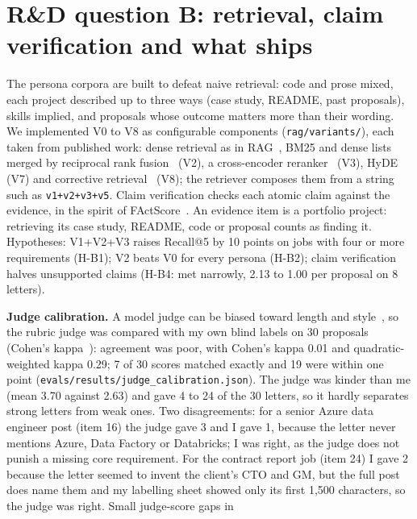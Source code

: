 \documentclass[10pt,a4paper]{article}
\newcommand{\file}[1]{\texttt{\small #1}}
\newcommand{\tablefrom}[2]{\begin{table}[h]\centering\caption{#2}\end{table}}
\begin{document}
\section{R\&D question B: retrieval, claim verification and what ships}
The persona corpora are built to defeat naive retrieval: code and prose mixed, each project described up to three
ways (case study, README, past proposals), skills implied, and proposals whose outcome matters more than their
wording. We implemented V0 to V8 as configurable components (\file{rag/variants/}), each taken from published work:
dense retrieval as in RAG~\cite{lewis2020rag}, BM25 and dense lists merged by reciprocal rank fusion~\cite{cormack2009rrf}
(V2), a cross-encoder reranker~\cite{nogueira2019rerank} (V3), HyDE~\cite{gao2023hyde} (V7) and corrective
retrieval~\cite{yan2024crag} (V8); the retriever composes them from a string such as \texttt{v1+v2+v3+v5}. Claim
verification checks each atomic claim against the evidence, in the spirit of FActScore~\cite{min2023factscore}. An evidence item is a portfolio project: retrieving its case study, README,
code or proposal counts as finding it. Hypotheses: V1+V2+V3 raises Recall@5 by 10 points on jobs with four or more
requirements (H-B1); V2 beats V0 for every persona (H-B2); claim verification halves unsupported claims (H-B4: met narrowly, 2.13 to 1.00 per proposal on 8 letters).
\tablefrom{rag}{Retrieval variants on the dev set.}
\tablefrom{main}{Baseline V0 against the shipped pipeline.}
\tablefrom{claims}{Unsupported claims before and after claim verification (shipped pipeline).}
\textbf{Judge calibration.} A model judge can be biased toward length and style~\cite{zheng2023judge}, so the rubric
judge was compared with my own blind labels on 30 proposals (Cohen's kappa~\cite{cohen1960kappa}):
agreement was poor, with Cohen's kappa 0.01 and quadratic-weighted kappa 0.29; 7 of 30 scores matched exactly and 19
were within one point (\file{evals/results/judge\_calibration.json}). The judge was kinder than me (mean 3.70 against
2.63) and gave 4 to 24 of the 30 letters, so it hardly separates strong letters from weak ones. Two disagreements: for
a senior Azure data engineer post (item 16) the judge gave 3 and I gave 1, because the letter never mentions Azure,
Data Factory or Databricks; I was right, as the judge does not punish a missing core requirement. For the contract
report job (item 24) I gave 2 because the letter seemed to invent the client's CTO and GM, but the full post does name
them and my labelling sheet showed only its first 1,500 characters, so the judge was right. Small judge-score gaps in
\end{document}
